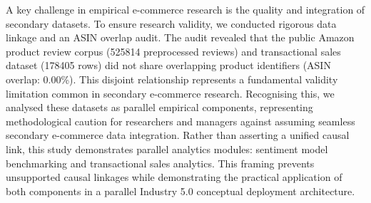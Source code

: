\documentclass[authoryear,review,3p,times,12pt]{elsarticle}
\begin{document}
A key challenge in empirical e-commerce research is the quality and integration of secondary datasets. To ensure research validity, we conducted rigorous data linkage and an ASIN overlap audit. The audit revealed that the public Amazon product review corpus (525814 preprocessed reviews) and transactional sales dataset (178405 rows) did not share overlapping product identifiers (ASIN overlap: 0.00\%). This disjoint relationship represents a fundamental validity limitation common in secondary e-commerce research. Recognising this, we analysed these datasets as parallel empirical components, representing methodological caution for researchers and managers against assuming seamless secondary e-commerce data integration. Rather than asserting a unified causal link, this study demonstrates parallel analytics modules: sentiment model benchmarking and transactional sales analytics. This framing prevents unsupported causal linkages while demonstrating the practical application of both components in a parallel Industry 5.0 conceptual deployment architecture.
\end{document}
